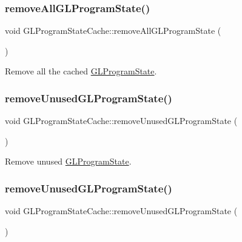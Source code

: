 \subsubsection{\texorpdfstring{remove\+All\+G\+L\+Program\+State()}{removeAllGLProgramState()}\hspace{0.1cm}{\footnotesize\ttfamily [2/2]}}
{\footnotesize\ttfamily void G\+L\+Program\+State\+Cache\+::remove\+All\+G\+L\+Program\+State (\begin{DoxyParamCaption}{ }\end{DoxyParamCaption})}

Remove all the cached \hyperlink{classGLProgramState}{G\+L\+Program\+State}. \mbox{\label{classGLProgramStateCache_a0ddcd455f29dc479f871a06f4c898b35}} 
\subsubsection{\texorpdfstring{remove\+Unused\+G\+L\+Program\+State()}{removeUnusedGLProgramState()}\hspace{0.1cm}{\footnotesize\ttfamily [1/2]}}
{\footnotesize\ttfamily void G\+L\+Program\+State\+Cache\+::remove\+Unused\+G\+L\+Program\+State (\begin{DoxyParamCaption}{ }\end{DoxyParamCaption})}

Remove unused \hyperlink{classGLProgramState}{G\+L\+Program\+State}. \mbox{\label{classGLProgramStateCache_a0ddcd455f29dc479f871a06f4c898b35}} 
\subsubsection{\texorpdfstring{remove\+Unused\+G\+L\+Program\+State()}{removeUnusedGLProgramState()}\hspace{0.1cm}{\footnotesize\ttfamily [2/2]}}
{\footnotesize\ttfamily void G\+L\+Program\+State\+Cache\+::remove\+Unused\+G\+L\+Program\+State (\begin{DoxyParamCaption}{ }\end{DoxyParamCaption})}


